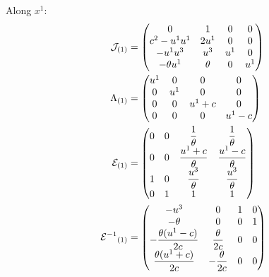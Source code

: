 \documentclass{article}
\begin{document}
Along $x^1$:
\begin{align}
    \mathcal{J}_{(1)} &= \left(
        \begin{matrix}
            0 & 1 & 0 & 0 \\
            c^2 - u^1u^1 & 2u^1 & 0 & 0 \\ 
            -u^1 u^3 & u^3 & u^1 & 0 \\
            -\theta u^1 & \theta & 0 & u^1
        \end{matrix}
        \right) \label{eq:elem_jac_1}\\
    \Lambda_{(1)} &= \left(
        \begin{matrix}
            u^1 & 0 & 0 & 0 \\
            0 & u^1 & 0 & 0 \\
            0 & 0 & u^1 + c & 0 \\
            0 & 0 & 0 & u^1 - c
        \end{matrix}
        \right) \\
    \mathcal{E}_{(1)} &= \left(
        \begin{matrix}
            0 & 0 & \dfrac{1}{\theta} & \dfrac{1}{\theta} \\
            0 & 0 & \dfrac{u^1 + c}{\theta} & \dfrac{u^1 - c}{\theta} \\
            1 & 0 & \dfrac{u^3}{\theta} & \dfrac{u^3}{\theta} \\
            0 & 1 & 1 & 1
        \end{matrix}
        \right) \\
    {{\mathcal{E}}^{-1}}_{(1)} &= \left(
        \begin{matrix}
            -u^3 & 0 & 1 & 0 \\
            -\theta & 0 & 0 & 1 \\
            -\dfrac{\theta(u^1 - c)}{2c} & \dfrac{\theta}{2c} & 0 & 0 \\
            \dfrac{\theta(u^1 + c)}{2c} & -\dfrac{\theta}{2c} & 0 & 0 
        \end{matrix}
        \right)
\end{align}
\end{document}
